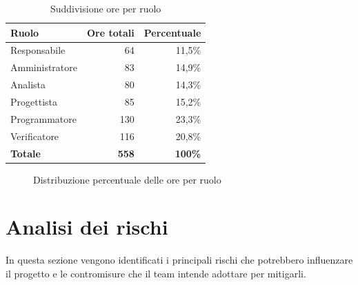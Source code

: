 \documentclass[11pt,a4paper]{article}
\begin{document}
\begin{table}[H]
    \centering
    \begin{tabular}{|l|r|r|}
        \hline
        \textbf{Ruolo} & \textbf{Ore totali} & \textbf{Percentuale} \\
        \hline
        Responsabile & 64 & 11,5\% \\
        \hline
        Amministratore & 83 & 14,9\% \\
        \hline
        Analista & 80 & 14,3\% \\
        \hline
        Progettista & 85 & 15,2\% \\
        \hline
        Programmatore & 130 & 23,3\% \\
        \hline
        Verificatore & 116 & 20,8\% \\
        \hline
        \textbf{Totale} & \textbf{558} & \textbf{100\%} \\
        \hline
    \end{tabular}
    \caption{Suddivisione ore per ruolo}
    \label{tab:ore_ruolo}
\end{table}

\vspace{1cm}

\begin{figure}[H]
    \centering
    \caption{Distribuzione percentuale delle ore per ruolo}
    \label{fig:torta_ruoli}
\end{figure}

\vspace{1cm}
\section{Analisi dei rischi}
In questa sezione vengono identificati i principali rischi che potrebbero influenzare il progetto e le contromisure che il team intende adottare per mitigarli.
\end{document}
